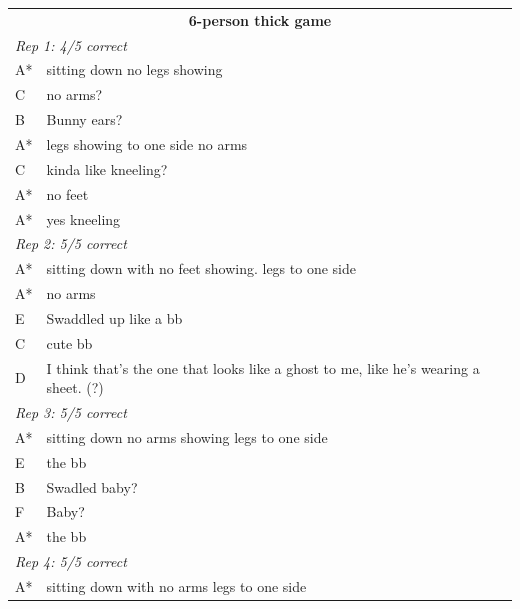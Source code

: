 \documentclass[
  english,
]{article}
\begin{document}
\begin{table}
\begin{subtable}{0.5\linewidth}
\begin{tabular}{lp{2.5in}}
            \multicolumn{2}{c}{\textbf{6-person thick game}}\\
            \multicolumn{2}{l}{\textit{Rep 1: 4/5 correct}}\\
            A*  &   sitting down no legs showing   \\                
            C   & no arms?\\                       
            B  &    Bunny ears?  \\                                  
            A*  &   legs showing to one side no arms  \\             
            C  &    kinda like kneeling?  \\                         
            A*  &   no feet      \\                                  
            A*   &  yes kneeling  \\
            \multicolumn{2}{l}{\textit{Rep 2: 5/5 correct}}\\
            A*  &   sitting down with no feet showing. legs to one side \\
            A*  &  no arms   \\                                     
            E &      Swaddled up like a bb \\                         
            C  &    cute bb    \\                                    
            D  &    I think that's the one that looks like a ghost to me, like he's wearing a sheet. (?)\\
            \multicolumn{2}{l}{\textit{Rep 3: 5/5 correct}}\\
            A*  &    sitting down no arms showing legs to one side  \\
            E  &   the bb   \\                                      
            B  &  Swadled baby?  \\                                
            F &    Baby?   \\   
            A* &    the bb     \\ 
            \multicolumn{2}{l}{\textit{Rep 4: 5/5 correct}}\\
            A*    & sitting down with no arms legs to one side \\
            \hline
        \end{tabular}
    \end{subtable}%
    \hspace*{2em}

\end{table}
\end{document}
